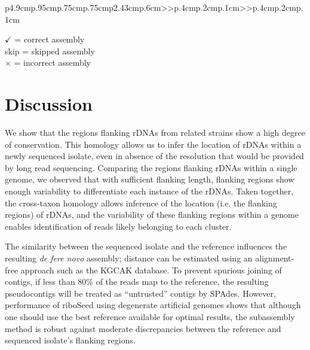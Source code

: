\documentclass[10pt]{article}
\begin{document}
\begin{linenumbers}
\begin{table}[!h]
{\begin{tabular}{p{4.9cm}p{.95cm}p{.75cm}p{.75cm}p{2.43cm}p{.6cm}>{\color{black}}>{\hfill}p{.4cm}p{.2cm}p{.1cm}>{\color{black}}>{\hfill}p{.4cm}p{.2cm}p{.1cm}}
    \bottomrule
    \begin{minipage}[t]{.5\textwidth}
      {\tiny
        $\checkmark$ = correct assembly \\ skip = skipped assembly \\ $\times$ = incorrect assembly
      }
    \end{minipage}
  \end{tabular}
  }
\end{table}

\section*{Discussion}
We show that the regions flanking rDNAs from related strains show a high degree of conservation. This homology allows us to infer the location of rDNAs within a newly sequenced isolate, even in absence of the resolution that would be provided by long read sequencing. Comparing the regions flanking rDNAs within a single genome, we observed that with sufficient flanking length, flanking regions show enough variability to differentiate each instance of the rDNAs. Taken together, the cross-taxon homology allows inference of the location (i.e. the flanking regions) of rDNAs, and the variability of these flanking regions within a genome enables identification of reads likely belonging to each cluster.


The similarity between the sequenced isolate and the reference influences the resulting \textit{de fere novo} assembly; distance can be estimated using an alignment-free approach such as the KGCAK database\cite{Wang2015b}. To prevent spurious joining of contigs, if less than 80\% of the reads map to the reference, the resulting pseudocontigs will be treated as ``untrusted'' contigs by SPAdes. However, performance of riboSeed using degenerate artificial genomes shows that although one should use the best reference available for optimal results, the subassembly method is robust against moderate discrepancies between the reference and sequenced isolate's flanking regions.




\end{linenumbers}
\end{document}
